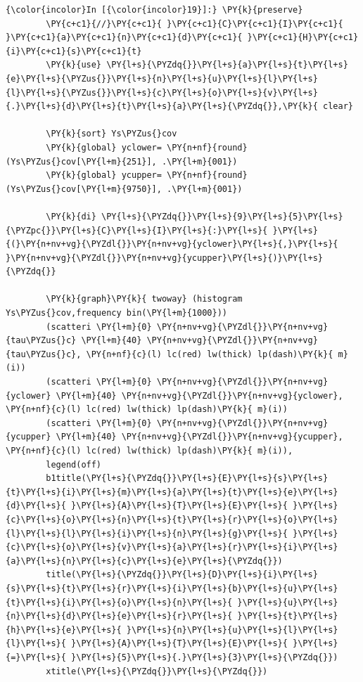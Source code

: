 \documentclass[11pt,notitlepage]{article}\usepackage[]{graphicx}\usepackage[]{color}
\makeatletter
\newenvironment{kframe}{%
 \def\at@end@of@kframe{}%
 \ifinner\ifhmode%
  \def\at@end@of@kframe{\end{minipage}}%
  \begin{minipage}{\columnwidth}%
 \fi\fi%
 \def\FrameCommand##1{\hskip\@totalleftmargin \hskip-\fboxsep
 \colorbox{shadecolor}{##1}\hskip-\fboxsep
     \hskip-\linewidth \hskip-\@totalleftmargin \hskip\columnwidth}%
 \MakeFramed {\advance\hsize-\width
   \@totalleftmargin\z@ \linewidth\hsize
   \@setminipage}}%
 {\par\unskip\endMakeFramed%
 \at@end@of@kframe}
\newenvironment{knitrout}{}{} %
\makeatother
\begin{document}
\begin{enumerate}[a)]
\begin{knitrout}
\begin{kframe}
\begin{Verbatim}[commandchars=\\\{\}]
    \end{Verbatim}

    \begin{Verbatim}[commandchars=\\\{\}]
{\color{incolor}In [{\color{incolor}19}]:} \PY{k}{preserve}
        \PY{c+c1}{//}\PY{c+c1}{ }\PY{c+c1}{C}\PY{c+c1}{I}\PY{c+c1}{ }\PY{c+c1}{a}\PY{c+c1}{n}\PY{c+c1}{d}\PY{c+c1}{ }\PY{c+c1}{H}\PY{c+c1}{i}\PY{c+c1}{s}\PY{c+c1}{t}
        \PY{k}{use} \PY{l+s}{\PYZdq{}}\PY{l+s}{a}\PY{l+s}{t}\PY{l+s}{e}\PY{l+s}{\PYZus{}}\PY{l+s}{n}\PY{l+s}{u}\PY{l+s}{l}\PY{l+s}{l}\PY{l+s}{\PYZus{}}\PY{l+s}{c}\PY{l+s}{o}\PY{l+s}{v}\PY{l+s}{.}\PY{l+s}{d}\PY{l+s}{t}\PY{l+s}{a}\PY{l+s}{\PYZdq{}},\PY{k}{ clear}
        
        \PY{k}{sort} Ys\PYZus{}cov
        \PY{k}{global} yclower= \PY{n+nf}{round}(Ys\PYZus{}cov[\PY{l+m}{251}], .\PY{l+m}{001})
        \PY{k}{global} ycupper= \PY{n+nf}{round}(Ys\PYZus{}cov[\PY{l+m}{9750}], .\PY{l+m}{001})
        
        \PY{k}{di} \PY{l+s}{\PYZdq{}}\PY{l+s}{9}\PY{l+s}{5}\PY{l+s}{\PYZpc{}}\PY{l+s}{C}\PY{l+s}{I}\PY{l+s}{:}\PY{l+s}{ }\PY{l+s}{(}\PY{n+nv+vg}{\PYZdl{}}\PY{n+nv+vg}{yclower}\PY{l+s}{,}\PY{l+s}{ }\PY{n+nv+vg}{\PYZdl{}}\PY{n+nv+vg}{ycupper}\PY{l+s}{)}\PY{l+s}{\PYZdq{}} 
        
        \PY{k}{graph}\PY{k}{ twoway} (histogram Ys\PYZus{}cov,frequency bin(\PY{l+m}{1000})) 
        (scatteri \PY{l+m}{0} \PY{n+nv+vg}{\PYZdl{}}\PY{n+nv+vg}{tau\PYZus{}c} \PY{l+m}{40} \PY{n+nv+vg}{\PYZdl{}}\PY{n+nv+vg}{tau\PYZus{}c}, \PY{n+nf}{c}(l) lc(red) lw(thick) lp(dash)\PY{k}{ m}(i)) 
        (scatteri \PY{l+m}{0} \PY{n+nv+vg}{\PYZdl{}}\PY{n+nv+vg}{yclower} \PY{l+m}{40} \PY{n+nv+vg}{\PYZdl{}}\PY{n+nv+vg}{yclower}, \PY{n+nf}{c}(l) lc(red) lw(thick) lp(dash)\PY{k}{ m}(i)) 
        (scatteri \PY{l+m}{0} \PY{n+nv+vg}{\PYZdl{}}\PY{n+nv+vg}{ycupper} \PY{l+m}{40} \PY{n+nv+vg}{\PYZdl{}}\PY{n+nv+vg}{ycupper}, \PY{n+nf}{c}(l) lc(red) lw(thick) lp(dash)\PY{k}{ m}(i)), 
        legend(off) 
        b1title(\PY{l+s}{\PYZdq{}}\PY{l+s}{E}\PY{l+s}{s}\PY{l+s}{t}\PY{l+s}{i}\PY{l+s}{m}\PY{l+s}{a}\PY{l+s}{t}\PY{l+s}{e}\PY{l+s}{d}\PY{l+s}{ }\PY{l+s}{A}\PY{l+s}{T}\PY{l+s}{E}\PY{l+s}{ }\PY{l+s}{c}\PY{l+s}{o}\PY{l+s}{n}\PY{l+s}{t}\PY{l+s}{r}\PY{l+s}{o}\PY{l+s}{l}\PY{l+s}{l}\PY{l+s}{i}\PY{l+s}{n}\PY{l+s}{g}\PY{l+s}{ }\PY{l+s}{c}\PY{l+s}{o}\PY{l+s}{v}\PY{l+s}{a}\PY{l+s}{r}\PY{l+s}{i}\PY{l+s}{a}\PY{l+s}{n}\PY{l+s}{c}\PY{l+s}{e}\PY{l+s}{\PYZdq{}}) 
        title(\PY{l+s}{\PYZdq{}}\PY{l+s}{D}\PY{l+s}{i}\PY{l+s}{s}\PY{l+s}{t}\PY{l+s}{r}\PY{l+s}{i}\PY{l+s}{b}\PY{l+s}{u}\PY{l+s}{t}\PY{l+s}{i}\PY{l+s}{o}\PY{l+s}{n}\PY{l+s}{ }\PY{l+s}{u}\PY{l+s}{n}\PY{l+s}{d}\PY{l+s}{e}\PY{l+s}{r}\PY{l+s}{ }\PY{l+s}{t}\PY{l+s}{h}\PY{l+s}{e}\PY{l+s}{ }\PY{l+s}{n}\PY{l+s}{u}\PY{l+s}{l}\PY{l+s}{l}\PY{l+s}{ }\PY{l+s}{A}\PY{l+s}{T}\PY{l+s}{E}\PY{l+s}{ }\PY{l+s}{=}\PY{l+s}{ }\PY{l+s}{5}\PY{l+s}{.}\PY{l+s}{3}\PY{l+s}{\PYZdq{}}) 
        xtitle(\PY{l+s}{\PYZdq{}}\PY{l+s}{\PYZdq{}})
        

\end{Verbatim}
\end{kframe}
\end{knitrout}
\end{enumerate}
\end{document}
